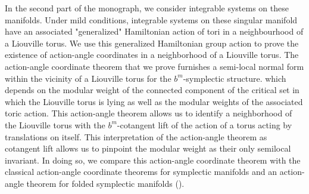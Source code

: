


In the second part of the monograph, we consider integrable systems on these manifolds. Under mild conditions, integrable systems on these singular manifold have an associated "generalized" Hamiltonian action of tori in a neighbourhood of a Liouville torus.  We use this generalized Hamiltonian group action to prove the existence of action-angle coordinates in a neighborhood of a Liouville torus.  The action-angle coordinate theorem that we prove furnishes a semi-local normal form within the vicinity of a Liouville torus for the $b^m$-symplectic structure.  which depends on the modular weight of the connected component of the critical set in which the Liouville torus is lying as well as the modular weights of the associated toric action. This action-angle theorem allows us to identify a neighborhood of the Liouville torus with the $b^m$-cotangent lift of the action of a torus acting by translations on itself. This interpretation of the action-angle theorem as cotangent lift allows us to pinpoint the modular weight as their only semilocal invariant. In doing so, we compare this action-angle coordinate theorem with the classical action-angle coordinate theorems for symplectic manifolds and an action-angle theorem for folded symplectic manifolds (\cite{EvaRobert}).


